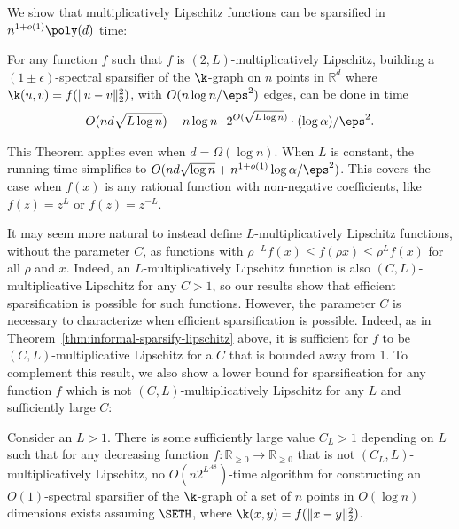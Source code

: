 We show that multiplicatively Lipschitz functions can be sparsified in
$n^{1+o(1)} \poly(d)$ time: 

\begin{theorem}\label{thm:informal-sparsify-lipschitz}
For any function $f$ such that $f$ is $(2, L)$-multiplicatively
Lipschitz, building a $(1\pm\epsilon)$-spectral sparsifier of the
$\k$-graph on $n$ points in $\mathbb{R}^d$ where $\k(u,v) = f(\|u -
    v\|_2^2)$, with $O(n \log n / \eps^2)$ edges, can be done in time
\begin{align*} O(nd \sqrt{L \log n}) + n \log n \cdot 2^{O(\sqrt{L \log
    n})} \cdot (\log\alpha)/\eps^2 .  \end{align*} \end{theorem} This
Theorem applies even when $d = \Omega(\log n)$. When $L$ is constant,
        the running time simplifies to $O(nd \sqrt{ \log n} + n^{1+o(1)}
            \log \alpha/ \eps^2)$. This covers the case when $f(x)$ is
        any rational function with non-negative coefficients, like $f(z)
  = z^L$ or $f(z) = z^{-L}$. 

It may seem more natural to instead define $L$-multiplicatively
Lipschitz functions, without the parameter $C$, as functions with
$\rho^{-L} f(x)\le f(\rho x)\le \rho^L f(x)$ for all $\rho$ and $x$.
Indeed, an $L$-multiplicatively Lipschitz function is also
$(C,L)$-multiplicative Lipschitz for any $C>1$, so our results show that
efficient sparsification is possible for such functions. However, the
parameter $C$ is necessary to characterize when efficient sparsification
is possible. Indeed, as in Theorem~\ref{thm:informal-sparsify-lipschitz}
above, it is sufficient for $f$ to be $(C,L)$-multiplicative Lipschitz
for a $C$ that is bounded away from 1. To complement this result, we
also show a lower bound for sparsification for any function $f$ which is
not $(C,L)$-multiplicatively Lipschitz for any $L$ and sufficiently
large $C$:


\begin{theorem}\label{thm:informal-high-spars-hard}
Consider an $L > 1$. There is some sufficiently large value $C_L > 1$
depending on $L$ such that for any decreasing function
$f:\mathbb{R}_{\ge 0}\rightarrow \mathbb{R}_{\ge 0}$ that is not
$(C_L,L)$-multiplicatively Lipschitz, no $O(n2^{L^{.48}})$-time
algorithm for constructing an $O(1)$-spectral sparsifier of the
$\k$-graph of a set of $n$ points in $O(\log n)$ dimensions exists
assuming $\SETH$, where $\k(x,y) = f(\|x-y\|_2^2)$.  \end{theorem}

